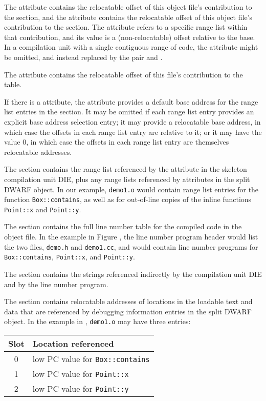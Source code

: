 The \DWATaddrbase{} attribute contains the relocatable offset of
this object file's contribution to the \dotdebugaddr{} section, and
the \DWATrangesbase{} attribute contains the relocatable offset
of this object file's contribution to the \dotdebugranges{} section.
The \DWATranges{} attribute refers to a specific range list within
that contribution, and its value is a (non-relocatable) offset
relative to the base. In a compilation unit with a single
contiguous range of code, the \DWATranges{} attribute might be
omitted, and instead replaced by the pair \DWATlowpc{} and
\DWAThighpc.

The \DWATstmtlist{} attribute contains the relocatable offset of
this file's contribution to the \dotdebugline{} table.

If there is a \DWATranges{} attribute, the \DWATlowpc{} attribute
provides a default base address for the range list entries in the
\dotdebugranges{} section. It may be omitted if each range list entry
provides an explicit base address selection entry; it may provide
a relocatable base address, in which case the offsets in each
range list entry are relative to it; or it may have the value 0,
in which case the offsets in each range list entry are themselves
relocatable addresses.

The \dotdebugranges{} section contains the range list referenced by
the \DWATranges{} attribute in the skeleton compilation unit DIE,
plus any range lists referenced by \DWATranges{} attributes in the
split DWARF object. In our example, \texttt{demo1.o} would contain range
list entries for the function \texttt{Box::contains}, as well as for
out-of-line copies of the inline functions \texttt{Point::x} and 
\texttt{Point::y}.

The \dotdebugline{} section contains the full line number table for
the compiled code in the object file. In the example in
Figure , the line
number program header would list the two files, \texttt{demo.h} and
\texttt{demo1.cc}, and would contain line number programs for
\texttt{Box::contains}, \texttt{Point::x}, and \texttt{Point::y}.

The \dotdebugstr{} section contains the strings referenced indirectly
by the compilation unit DIE and by the line number program.

The \dotdebugaddr{} section contains relocatable addresses of
locations in the loadable text and data that are referenced by
debugging information entries in the split DWARF object. In the
example in , 
\texttt{demo1.o} may have three entries:
\begin{center}
\begin{tabular}{cl}
Slot & Location referenced \\
\hline
   0   &  low PC value for \texttt{Box::contains}  \\
   1   &  low PC value for \texttt{Point::x}       \\
   2   &  low PC value for \texttt{Point::y}       \\
\end{tabular}
\end{center}

